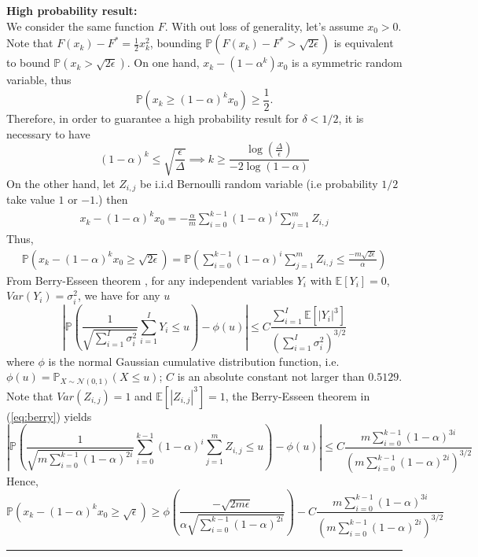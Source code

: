 \documentclass{article}
\theoremstyle{definition}  \newtheorem{exercise}{Exercise}
\theoremstyle{plain}
\newcommand{\EE}{\mathbb{E}}
\newcommand{\PP}{\mathbb{P}}
\renewenvironment{proof}{\par\noindent{\bf Proof\ }}{\hfill\BlackBox\\[2mm]}
\newcommand{\BlackBox}{\rule{1.5ex}{1.5ex}}
\theoremstyle{definition}
\theoremstyle{remark}
\begin{document}
\begin{proof}
{\bf High probability result:}\\
We consider the same function $F$. With out loss of generality, let's assume $x_0 > 0$. Note that $F(x_k)-F^* = \frac{1}{2}x_k^2$, bounding $\PP(F(x_k)-F^* > \sqrt{2\epsilon})$ is equivalent to bound $\PP(x_k > \sqrt{2\epsilon})$. On one hand, $x_k - (1-\alpha^k)x_0$ is a symmetric random variable, thus 
\[ \PP(x_k \ge (1-\alpha)^k x_0) \ge \frac{1}{2}. \]
Therefore, in order to guarantee a high probability result for $\delta < 1/2$, it is necessary to have 
\[ (1-\alpha)^k \le \sqrt{\frac{\epsilon}{\Delta}} \implies k \ge  \frac{\log \left( \frac{\Delta}{\epsilon} \right )}{-2\log (1-\alpha)}  \]
On the other hand, let $Z_{i,j}$ be i.i.d Bernoulli random variable (i.e probability $1/2$ take value $1$ or $-1$.) then
\begin{align}
x_k -(1-\alpha)^{k}x_0 = -\frac{\alpha }{m} \sum_{i=0}^{k-1} (1-\alpha)^i \sum_{j=1}^m Z_{i,j}
\end{align}
Thus,
\begin{align*}
    \PP \left (x_k -(1-\alpha)^{k}x_0 \ge \sqrt{2\epsilon} \right ) =  \PP \left ( \sum_{i=0}^{k-1} (1-\alpha)^i \sum_{j=1}^m Z_{i,j} \le \frac{ -m \sqrt{ 2\epsilon}}{\alpha} \right ) 
\end{align*}
From Berry-Esseen theorem \cite{berry1941accuracy,esseen1942,korolev2010upper}, for any independent variables $Y_i$ with $\EE[Y_i] =0$, $Var(Y_i) = \sigma_i^2$, we have for any $u$
\begin{equation}\label{eq:berry}
    \left | \PP \left ( \frac{1}{\sqrt{ \sum_{i=1}^I \sigma_i^2 }} \sum_{i=1}^I Y_{i} \le u \right )  - \phi \left( u \right ) \right | 
\le C \frac{ \sum_{i=1}^I \EE[|Y_i|^3]}{(\sum_{i=1}^I \sigma_i^2 )^{3/2}} 
\end{equation} 
where $\phi$ is the normal Gaussian cumulative distribution function, i.e. $\phi(u) = \PP_{X \sim \mathcal{N}(0,1)}(X \le u)$; $C$ is an absolute constant not larger than ${0.5129}$.
Note that $Var(Z_{i,j}) = 1$ and $\EE[|Z_{i,j}|^3] = 1$, the Berry-Esseen theorem in (\ref{eq:berry}) yields
\begin{equation}
    \left | \PP \left ( \frac{1}{\sqrt{ m \sum_{i=0}^{k-1} (1-\alpha)^{2i} }} \sum_{i=0}^{k-1} (1-\alpha)^i \sum_{j=1}^m Z_{i,j}  \le u \right )  - \phi \left( u \right ) \right | 
\le C \frac{ m \sum_{i=0}^{k-1} (1-\alpha)^{3i}}{( m \sum_{i=0}^{k-1} (1-\alpha)^{2i})^{3/2}} 
\end{equation} 
Hence,
\[ \PP \left (x_k -(1-\alpha)^{k}x_0 \ge \sqrt{\epsilon} \right ) \ge \phi \left ( \frac{-\sqrt{2m \epsilon}}{\alpha \sqrt{  \sum_{i=0}^{k-1} (1-\alpha)^{2i} }}  \right ) - C \frac{ m \sum_{i=0}^{k-1} (1-\alpha)^{3i}}{( m \sum_{i=0}^{k-1} (1-\alpha)^{2i})^{3/2}}  \]


\end{proof}
\end{document}
